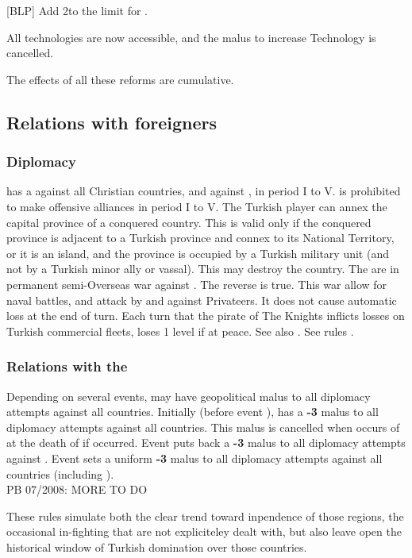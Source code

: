 [BLP] Add 2\LeaderG to the limit for \TUR.

All technologies are now accessible, and the malus to increase
Technology is cancelled.

\aparag The effects of all these reforms are cumulative.

\subsection{Relations with foreigners}
\subsubsection{Diplomacy}
\aparag \TUR has a \CB against all Christian countries, and against
, in period I to V.
\aparag \TUR is prohibited to make offensive alliances in period I to V.
The Turkish player can annex the capital province of a conquered
country. This is valid only if the conquered province is adjacent to a
Turkish province and connex to its National Territory, or it is an island,
and the province is occupied by a Turkish military
unit (and not by a Turkish minor ally or vassal). This may destroy the
country.
The  are in permanent semi-Overseas war against
\TUR. The reverse is true. This war allow for naval battles, and attack
by and against Privateers. It does not cause automatic \STAB loss at the
end of turn.
\bparag Each turn that the pirate of The Knights inflicts losses on
Turkish commercial fleets, \TUR loses 1 \STAB level if at peace.
\aparag See also .
See rules .


\subsubsection{Relations with the }
\aparag Depending on several events, \TUR may have geopolitical malus to
all diplomacy attempts against all  countries.
\bparag Initially (before event ), \TUR has a {\bf -3} malus to all diplomacy attempts
against all  countries.
\bparag This malus is cancelled when  occurs of at the death of  if
 occurred.
\bparag Event  puts back a {\bf -3} malus to all
diplomacy attempts against .
\bparag Event  sets a uniform {\bf -3} malus
to all diplomacy attempts against all  countries
(including ).
\\
PB 07/2008: MORE TO DO
\begin{designnote}
These rules simulate both the clear trend toward inpendence of those regions,
the occasional in-fighting that are not expliciteley dealt with, but also leave
open the historical window of Turkish domination over those countries.
\end{designnote}

